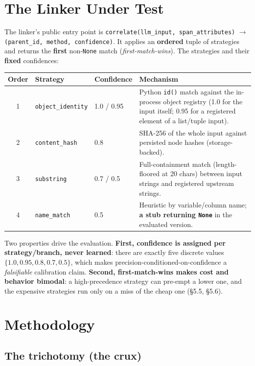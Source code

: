 \documentclass[11pt]{article}
\newcommand{\dto}{\ensuremath{\rightarrow}}     %
\begin{document}
\section{The Linker Under Test}

The linker's public entry point is \texttt{correlate(llm\_input, span\_attributes)} \dto{} \texttt{(parent\_id,
method, confidence)}. It applies an \textbf{ordered} tuple of strategies and returns the \textbf{first}
non-\texttt{None} match (\emph{first-match-wins}). The strategies and their \textbf{fixed} confidences:

\begin{table}[h]
\centering
\small
\begin{tabular}{@{}cl l p{7.2cm}@{}}
\toprule
Order & Strategy & Confidence & Mechanism \\
\midrule
1 & \texttt{object\_identity} & 1.0 / 0.95 & Python \texttt{id()} match against the in-process object
registry (1.0 for the input itself; 0.95 for a registered element of a list/tuple input). \\
2 & \texttt{content\_hash} & 0.8 & SHA-256 of the whole input against persisted node hashes
(storage-backed). \\
3 & \texttt{substring} & 0.7 / 0.5 & Full-containment match (length-floored at 20 chars) between input
strings and registered upstream strings. \\
4 & \texttt{name\_match} & 0.5 & Heuristic by variable/column name; \textbf{a stub returning
\texttt{None}} in the evaluated version. \\
\bottomrule
\end{tabular}
\end{table}

Two properties drive the evaluation. \textbf{First, confidence is assigned per strategy/branch, never
learned}: there are exactly five discrete values $\{1.0, 0.95, 0.8, 0.7, 0.5\}$, which makes
precision-conditioned-on-confidence a \emph{falsifiable} calibration claim. \textbf{Second, first-match-wins
makes cost and behavior bimodal}: a high-precedence strategy can pre-empt a lower one, and the expensive
strategies run only on a miss of the cheap one (\S5.5, \S5.6).

\section{Methodology}

\subsection{The trichotomy (the crux)}
\end{document}
